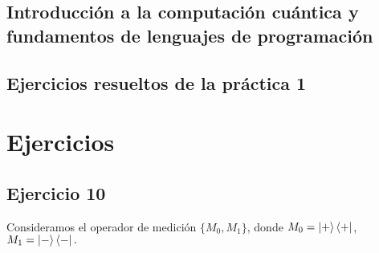 \documentclass[a4paper,11pt]{article}
\title{}
\author{}
\begin{document}
\maketitle 

\thispagestyle{empty}
\begin{center}
\section*{Introducción a  la computación cuántica y fundamentos de lenguajes de programación} 
\subsection*{Ejercicios resueltos de la práctica 1}

\end{center}

\newpage{\pagestyle{empty}\cleardoublepage}

\newpage

\DeclarePairedDelimiter\floor{\lfloor}{\rfloor}

\section*
{Ejercicios}

\subsection*{Ejercicio 10}
Consideramos el operador de medición $\{ M_{0}, M_{1}\}$, donde $M_{0}=\left\vert{+}\right\rangle\left\langle{+}\right\vert$, $M_{1}=\left\vert{-}\right\rangle\left\langle{-}\right\vert.$
\end{document}
